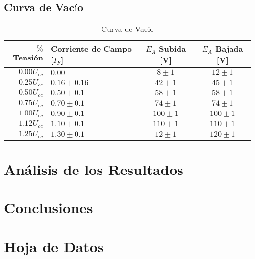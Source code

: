 \documentclass[11pt,letterpaper]{article}
\begin{document}
\subsection{Curva de Vacío}
\begin{table}[t]
	\begin{center}
		\begin{tabular}{| r | l | c | c |}
			\hline
			$\%$Tensión  & Corriente de Campo [$I_{F}$]  & $E_{A}$ Subida [V] & $E_{A}$ Bajada [V] \\ \hline
			$0.00 U_{cc}$ & $0.00$          & $8   \pm 1$ & $12  \pm 1$ \\
			$0.25 U_{cc}$ & $0.16 \pm 0.16$ & $42  \pm 1$ & $45  \pm 1$ \\
			$0.50 U_{cc}$ & $0.50 \pm 0.1$  & $58  \pm 1$ & $58  \pm 1$ \\
			$0.75 U_{cc}$ & $0.70 \pm 0.1$  & $74  \pm 1$ & $74  \pm 1$ \\
			$1.00 U_{cc}$ & $0.90 \pm 0.1$  & $100 \pm 1$ & $100 \pm 1$ \\  
			$1.12 U_{cc}$ & $1.10 \pm 0.1$  & $110 \pm 1$ & $110 \pm 1$ \\
			$1.25 U_{cc}$ & $1.30 \pm 0.1$  & $12  \pm 1$ & $120 \pm 1$ \\  \hline
		\end{tabular}
		\caption{Curva de Vacio}
		\label{tab:Curva de Vacio}
	\end{center}
\end{table}
\section{Análisis de los Resultados}
\section{Conclusiones}
\section{Hoja de Datos}
\end{document}
